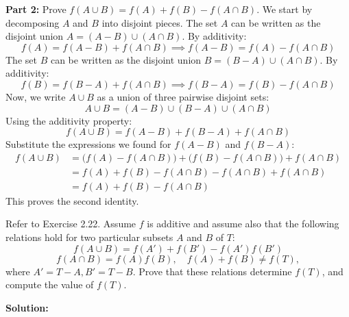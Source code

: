 \textbf{Part 2:} Prove $f(A \cup B) = f(A) + f(B) - f(A \cap B)$.
We start by decomposing $A$ and $B$ into disjoint pieces.
The set $A$ can be written as the disjoint union $A = (A - B) \cup (A \cap B)$. By additivity:
\[ f(A) = f(A - B) + f(A \cap B) \implies f(A-B) = f(A) - f(A \cap B) \]
The set $B$ can be written as the disjoint union $B = (B - A) \cup (A \cap B)$. By additivity:
\[ f(B) = f(B - A) + f(A \cap B) \implies f(B-A) = f(B) - f(A \cap B) \]
Now, we write $A \cup B$ as a union of three pairwise disjoint sets:
\[ A \cup B = (A - B) \cup (B - A) \cup (A \cap B) \]
Using the additivity property:
\[ f(A \cup B) = f(A-B) + f(B-A) + f(A \cap B) \]
Substitute the expressions we found for $f(A-B)$ and $f(B-A)$:
\begin{align*}
f(A \cup B) &= \big(f(A) - f(A \cap B)\big) + \big(f(B) - f(A \cap B)\big) + f(A \cap B) \\
&= f(A) + f(B) - f(A \cap B) - f(A \cap B) + f(A \cap B) \\
&= f(A) + f(B) - f(A \cap B)
\end{align*}
This proves the second identity.



\begin{problembox}

Refer to Exercise 2.22. Assume \(f\) is additive and assume also that the following relations hold for two particular subsets \(A\) and \(B\) of \(T\):
\[
f(A \cup B) = f(A') + f(B') - f(A')f(B')
\]
\[
f(A \cap B) = f(A)f(B), \quad f(A) + f(B) \ne f(T),
\]
where \(A' = T - A, B' = T - B\). Prove that these relations determine \(f(T)\), and compute the value of \(f(T)\).
\end{problembox}

\textbf{Solution:}

